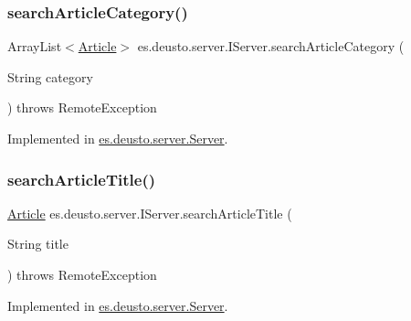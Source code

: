 \subsubsection{\texorpdfstring{search\+Article\+Category()}{searchArticleCategory()}}
{\footnotesize\ttfamily Array\+List$<$\hyperlink{classes_1_1deusto_1_1server_1_1jdo_1_1_article}{Article}$>$ es.\+deusto.\+server.\+I\+Server.\+search\+Article\+Category (\begin{DoxyParamCaption}\item[{String}]{category }\end{DoxyParamCaption}) throws Remote\+Exception}



Implemented in \hyperlink{classes_1_1deusto_1_1server_1_1_server_ab2729689bb71bd707881b563cdf2a006}{es.\+deusto.\+server.\+Server}.

\mbox{\label{interfacees_1_1deusto_1_1server_1_1_i_server_ab2c4bd97c628b735feedcf16e6aeb6b8}} 
\subsubsection{\texorpdfstring{search\+Article\+Title()}{searchArticleTitle()}}
{\footnotesize\ttfamily \hyperlink{classes_1_1deusto_1_1server_1_1jdo_1_1_article}{Article} es.\+deusto.\+server.\+I\+Server.\+search\+Article\+Title (\begin{DoxyParamCaption}\item[{String}]{title }\end{DoxyParamCaption}) throws Remote\+Exception}



Implemented in \hyperlink{classes_1_1deusto_1_1server_1_1_server_a56ae654d89e8113c79615077ed4a6e24}{es.\+deusto.\+server.\+Server}.

\mbox{\label{interfacees_1_1deusto_1_1server_1_1_i_server_ab1b33472017b55ae84bf849430db5f1b}} 
